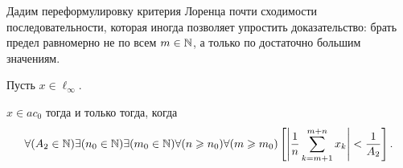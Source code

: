 Дадим переформулировку критерия Лоренца
\cite{lorentz1948contribution,bennett1974consistency}
почти сходимости последовательности,
которая иногда позволяет упростить доказательство:
брать предел равномерно не по всем $m\in \N$,
а только по достаточно большим значениям.


\begin{theorem}
	\label{thm:Lorentz_mod}
	Пусть $x\in\ell_\infty$.

	$x\in ac_0$ тогда и только тогда, когда
	\begin{equation}\label{crit_pos_ac0}
		\forall(A_2\in\N)
		\exists(n_0\in\N)
		\exists(m_0\in\N)
		\forall(n\geq n_0)
		\forall(m\geq m_0)
		\\
		\left[
			\left|
			\frac{1}{n}
			\sum_{k=m+1}^{m+n} x_k
			\right|
			<
			\frac{1}{A_2}
		\right]
		.
	\end{equation}

\end{theorem}

